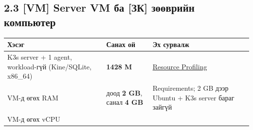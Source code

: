 \hypertarget{vm-server-vm-ux431ux430-ux437ux43a-ux437ux4e9ux4e9ux432ux440ux438ux439ux43d-ux43aux43eux43cux43fux44cux44eux442ux435ux440}{%
\subsection{2.3 {[}VM{]} Server VM ба {[}ЗК{]} зөөврийн компьютер}\label{vm-server-vm-ux431ux430-ux437ux43a-ux437ux4e9ux4e9ux432ux440ux438ux439ux43d-ux43aux43eux43cux43fux44cux44eux442ux435ux440}}

\begingroup\scriptsize\begin{longtable}[]{@{}lll@{}}
\toprule
\begin{minipage}[b]{0.30\columnwidth}\raggedright
Хэсэг\strut
\end{minipage} & \begin{minipage}[b]{0.30\columnwidth}\raggedright
Санах ой\strut
\end{minipage} & \begin{minipage}[b]{0.30\columnwidth}\raggedright
Эх сурвалж\strut
\end{minipage}\tabularnewline
\midrule
\endhead
\begin{minipage}[t]{0.30\columnwidth}\raggedright
K3s server + 1 agent, workload-гүй (Kine/SQLite, x86\_64)\strut
\end{minipage} & \begin{minipage}[t]{0.30\columnwidth}\raggedright
\textbf{1428 M}\strut
\end{minipage} & \begin{minipage}[t]{0.30\columnwidth}\raggedright
\href{https://docs.k3s.io/reference/resource-profiling}{Resource Profiling}\strut
\end{minipage}\tabularnewline
\begin{minipage}[t]{0.30\columnwidth}\raggedright
VM-д өгөх RAM\strut
\end{minipage} & \begin{minipage}[t]{0.30\columnwidth}\raggedright
доод \textbf{2 GB}, санал \textbf{4 GB}\strut
\end{minipage} & \begin{minipage}[t]{0.30\columnwidth}\raggedright
Requirements; 2 GB дээр Ubuntu + K3s server бараг зайгүй\strut
\end{minipage}\tabularnewline
\begin{minipage}[t]{0.30\columnwidth}\raggedright
VM-д өгөх vCPU\strut
\end{minipage} & \begin{minipage}[t]{0.30\columnwidth}\raggedright

\end{minipage}
\end{longtable}
